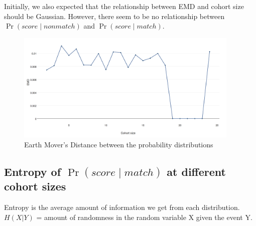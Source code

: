 Initially, we also expected that the relationship between EMD and cohort size
should be Gaussian. However, there seem to be no relationship between
$\Pr{(score \mid nonmatch)}$ and $\Pr{(score \mid match)}$.

\begin{figure}[ht]
  \centering
  \includegraphics[width=0.95\textwidth]{dataset/otago/emd}
  \caption{Earth Mover's Distance between the probability distributions}
  \label{fig:otago_emd} %
\end{figure}

\subsection{Entropy of $\Pr{(score \mid match)}$ at different cohort sizes}

Entropy is the average amount of information we get from each distribution.
$H(X|Y)$ = amount of randomness in the random variable X given the event Y.

